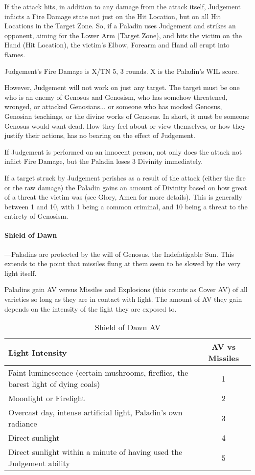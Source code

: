 \documentclass[oneside,11pt,english]{book}
\begin{document}
If the attack hits, in addition to any damage from the attack itself, Judgement inflicts a Fire Damage state not just on the Hit Location, but on all Hit Locations in the Target Zone. So, if a Paladin uses Judgement and strikes an opponent, aiming for the Lower Arm (Target Zone), and hits the victim on the Hand (Hit Location), the victim's Elbow, Forearm and Hand all erupt into flames.

Judgement's Fire Damage is X/TN 5, 3 rounds. X is the Paladin's WIL score.

However, Judgement will not work on just any target. The target must be one who is an enemy of 
Genosus and Genosism, who has somehow threatened, wronged, or attacked Genosians... or 
someone who has mocked Genosus, Genosian teachings, or the divine works of Genosus. In 
short, it must be someone Genosus would want dead. How they feel about or view themselves, or 
how they justify their actions, has no bearing on the effect of Judgement. 

If Judgement is performed on an innocent person, not only does the attack not inflict Fire Damage, but the Paladin loses 3 Divinity immediately. 

If a target struck by Judgement perishes as a result of the attack (either the fire or the raw 
damage) the Paladin gains an amount of Divinity based on how great of a threat the victim was 
(see Glory, Amen for more details). This is generally between 1 and 10, with 1 being a common 
criminal, and 10 being a threat to the entirety of Genosism. 
\paragraph{Shield of Dawn}
---\quad Paladins are protected by the will of Genosus, the Indefatigable Sun. This extends to the point 
that missiles flung at them seem to be slowed by the very light itself.

Paladins gain AV versus Missiles and Explosions (this counts as Cover AV) of all varieties so 
long as they are in contact with light. The amount of AV they gain depends on the intensity of the 
light they are exposed to.

\begin{table}[!ht]
  \caption{Shield of Dawn AV}
  \label{tab:Shield of Dawn AV}
  \begin{tabu} spread 0pt {Xc}
    Light Intensity& AV vs Missiles\\\toprule
    Faint luminescence (certain mushrooms, fireflies, the barest light of dying coals)& 1\\
    Moonlight or Firelight &2\\
    Overcast day, intense artificial light, Paladin's own radiance& 3\\
    Direct sunlight& 4\\
    Direct sunlight within a minute of having used the Judgement ability& 5\\
  \end{tabu}
\end{table}
\end{document}
